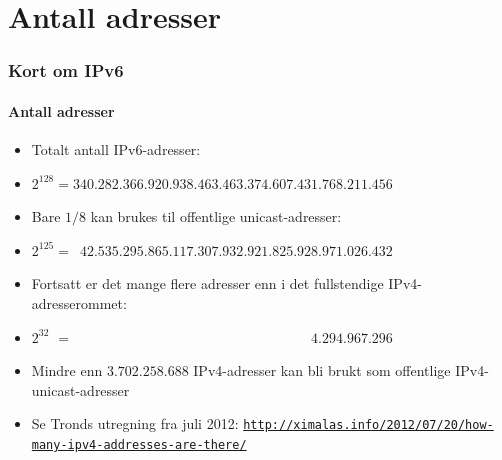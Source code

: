 \section{Antall adresser}
\begin{frame}%
  \frametitle{Kort om IPv6}
  \framesubtitle{Antall adresser}
  \pause
  \begin{itemize}[<+->]
  \item Totalt antall IPv6-adresser:
  \item $2^{128}=340.282.366.920.938.463.463.374.607.431.768.211.456$
  \item Bare $1/8$ kan brukes til offentlige unicast-adresser:
  \item
    $2^{125}=\phantom{0}42.535.295.865.117.307.932.921.825.928.971.026.432$
  \item Fortsatt er det mange flere adresser enn i det fullstendige
    IPv4-adresserommet:
  \item
    $2^{32\phantom{0}}=\phantom{000.000.000.000.000.000.000.000.000.00}4.294.967.296$
  \item Mindre enn \alert<9>{$3.702.258.688$} IPv4-adresser kan bli brukt som
    offentlige IPv4-unicast-adresser
  \item Se Tronds utregning fra juli 2012:
    \texttt{\url{http://ximalas.info/2012/07/20/how-many-ipv4-addresses-are-there/}}
  \end{itemize}
\end{frame}

